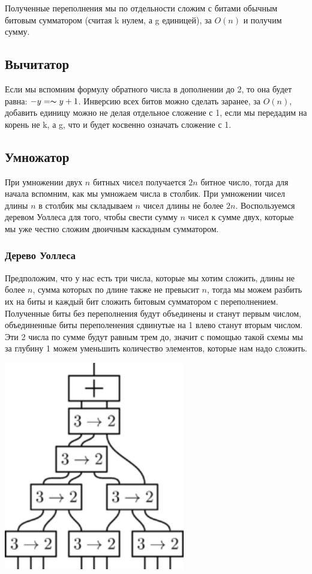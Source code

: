 Полученные переполнения мы по отдельности сложим с битами обычным битовым сумматором (считая k нулем, а g единицей), за $O(n)$ и получим сумму.
\subsection{Вычитатор}
Если мы вспомним формулу обратного числа в дополнении до 2, то она будет равна: $-y=\thicksim y+1$. Инверсию всех битов можно сделать заранее, за $O(n)$, добавить единицу можно не делая отдельное сложение с 1, если мы передадим на корень не k, а g, что и будет косвенно означать сложение с 1.

\subsection{Умножатор}
При умножении двух $n$ битных чисел получается $2n$ битное число, тогда для начала вспомним, как мы умножаем числа в столбик. При умножении чисел длины $n$ в столбик мы складываем $n$ чисел длины не более $2n$. Воспользуемся деревом Уоллеса для того, чтобы свести сумму $n$ чисел к сумме двух, которые мы уже честно сложим двоичным каскадным сумматором.
\subsubsection{Дерево Уоллеса}
Предположим, что у нас есть три числа, которые мы хотим сложить, длины не более $n$, сумма которых по длине также не превысит $n$, тогда мы можем разбить их на биты и каждый бит сложить битовым сумматором с переполнением. Полученные биты без переполнения будут объединены и станут первым числом, объединенные биты переполенения сдвинутые на 1 влево станут вторым числом. Эти 2 числа по сумме будут равным трем до, значит с помощью такой схемы мы за глубину 1 можем уменьшить количество элементов, которые нам надо сложить. 

\begin{center}
    \includegraphics[height=9.1cm]{assets/wallace.png}
  \end{center}

